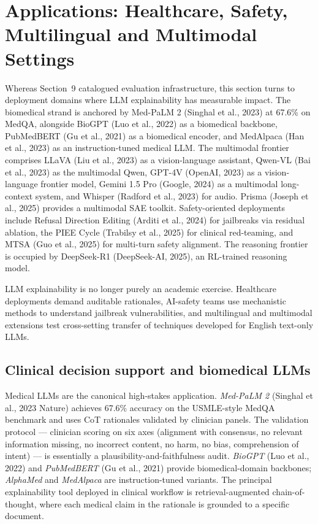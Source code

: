 \section{Applications: Healthcare, Safety, Multilingual and Multimodal Settings}\label{applications-healthcare-safety-multilingual-and-multimodal-settings}

Whereas Section~9 catalogued evaluation infrastructure, this section turns to deployment domains where LLM explainability has measurable impact. The biomedical strand is anchored by Med-PaLM 2 (Singhal et al., 2023) at 67.6\% on MedQA, alongside BioGPT (Luo et al., 2022) as a biomedical backbone, PubMedBERT (Gu et al., 2021) as a biomedical encoder, and MedAlpaca (Han et al., 2023) as an instruction-tuned medical LLM. The multimodal frontier comprises LLaVA (Liu et al., 2023) as a vision-language assistant, Qwen-VL (Bai et al., 2023) as the multimodal Qwen, GPT-4V (OpenAI, 2023) as a vision-language frontier model, Gemini 1.5 Pro (Google, 2024) as a multimodal long-context system, and Whisper (Radford et al., 2023) for audio. Prisma (Joseph et al., 2025) provides a multimodal SAE toolkit. Safety-oriented deployments include Refusal Direction Editing (Arditi et al., 2024) for jailbreaks via residual ablation, the PIEE Cycle (Trabilsy et al., 2025) for clinical red-teaming, and MTSA (Guo et al., 2025) for multi-turn safety alignment. The reasoning frontier is occupied by DeepSeek-R1 (DeepSeek-AI, 2025), an RL-trained reasoning model.

LLM explainability is no longer purely an academic exercise. Healthcare deployments demand auditable rationales, AI-safety teams use mechanistic methods to understand jailbreak vulnerabilities, and multilingual and multimodal extensions test cross-setting transfer of techniques developed for English text-only LLMs.

\subsection{Clinical decision support and biomedical LLMs}\label{clinical-decision-support-and-biomedical-llms}

Medical LLMs are the canonical high-stakes application. \emph{Med-PaLM 2} (Singhal et al., 2023 Nature) achieves 67.6\% accuracy on the USMLE-style MedQA benchmark and uses CoT rationales validated by clinician panels. The validation protocol --- clinician scoring on six axes (alignment with consensus, no relevant information missing, no incorrect content, no harm, no bias, comprehension of intent) --- is essentially a plausibility-and-faithfulness audit. \emph{BioGPT} (Luo et al., 2022) and \emph{PubMedBERT} (Gu et al., 2021) provide biomedical-domain backbones; \emph{AlphaMed} and \emph{MedAlpaca} are instruction-tuned variants. The principal explainability tool deployed in clinical workflow is retrieval-augmented chain-of-thought, where each medical claim in the rationale is grounded to a specific document.


